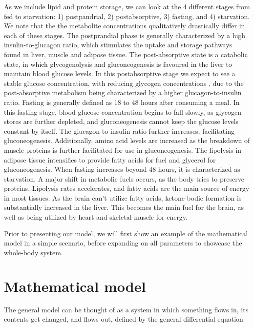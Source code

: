 \documentclass{IEEEtran}
\begin{document}
As we include lipid and protein storage, we can look at the 4 different stages from fed to starvation: 1) postpandrial, 2) postabsorptive, 3) fasting, and 4) starvation. We note that the the metabolite concentrations qualitatively drastically differ in each of these stages. The postprandial phase is generally characterized by a high insulin-to-glucagon ratio, which stimulates the uptake and storage pathways found in liver, muscle and adipose tissue. The post-absorptive state is a catabolic state, in which glycogenolysis and gluconeogenesis is favoured in the liver to maintain blood glucose levels. In this postabsorptive stage we expect to see a stable glucose concentration, with reducing glycogen concentrations \cite{gropper_smith_carr_2018}, due to the post-absorptive metabolism being characterized by a higher glucagon-to-insulin ratio. Fasting is generally defined as 18 to 48 hours after consuming a meal. In this fasting stage, blood glucose concentration begins to fall slowly, as glycogen stores are further depleted, and gluconeogenesis cannot keep the glucose levels constant by itself. The glucagon-to-insulin ratio further increases, facilitating gluconeogenesis. Additionally, amino acid levels are increased as the breakdown of muscle proteins is further facilitated for use in gluconeogenesis. The lipolysis in adipose tissue intensifies to provide fatty acids for fuel and glycerol for gluconeogenesis. When fasting increases beyond 48 hours, it is characterized as starvation. A major shift in metabolic fuels occurs, as the body tries to preserve proteins. Lipolysis rates accelerates, and fatty acids are the main source of energy in most tissues. As the brain can’t utilize fatty acids, ketone bodie formation is substantially increased in the liver. This becomes the main fuel for the brain, as well as being utilized by heart and skeletal muscle for energy. 


Prior to presenting our model, we will first show an example of the mathematical model in a simple scenario, before expanding on all parameters to showcase the whole-body system. 


\section{Mathematical model}
\label{sec:mathmaticalmodel}


The general model can be thought of as a system in which something flows in, its contents get changed, and flows out, defined by the general differential equation
\end{document}
